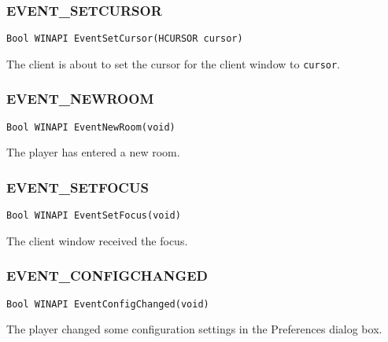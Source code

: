 \subsubsection{EVENT\_SETCURSOR}   
\begin{verbatim}
Bool WINAPI EventSetCursor(HCURSOR cursor)
\end{verbatim}

The client is about to set the cursor for the client window to {\tt cursor}.

\subsubsection{EVENT\_NEWROOM}     
\begin{verbatim}
Bool WINAPI EventNewRoom(void)
\end{verbatim}

The player has entered a new room.

\subsubsection{EVENT\_SETFOCUS}    
\begin{verbatim}
Bool WINAPI EventSetFocus(void)
\end{verbatim}

The client window received the focus.

\subsubsection{EVENT\_CONFIGCHANGED}
\begin{verbatim}
Bool WINAPI EventConfigChanged(void)
\end{verbatim}

The player changed some configuration settings in the Preferences
dialog box.
